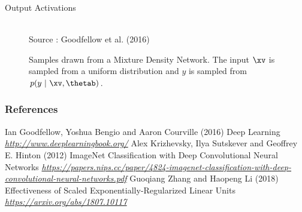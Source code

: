 \begin{frame} {Output Activations}
  \begin{figure}
    \centering
      \tiny{\\ Source : Goodfellow et al. (2016)}
      \caption{\footnotesize Samples drawn from a Mixture Density Network. The input $\xv$ is sampled from a uniform distribution and $y$ is sampled from $p(y~|~\xv,\thetab)$.}
  \end{figure}
\end{frame}

\begin{vbframe}
\frametitle{References}
\footnotesize{
\begin{thebibliography}{99}
 Ian Goodfellow, Yoshua Bengio and Aaron Courville (2016)
\newblock Deep Learning
\newblock \emph{\url{http://www.deeplearningbook.org/}}
 Alex Krizhevsky, Ilya Sutskever and Geoffrey E. Hinton (2012)
\newblock ImageNet Classification with Deep Convolutional Neural Networks
\newblock \emph{\url{https://papers.nips.cc/paper/4824-imagenet-classification-with-deep-convolutional-neural-networks.pdf}}
 Guoqiang Zhang and Haopeng Li (2018)
\newblock Effectiveness of Scaled Exponentially-Regularized Linear Units 
\newblock \emph{\url{https://arxiv.org/abs/1807.10117}}
\end{thebibliography}
}
\end{vbframe}

\endlecture
